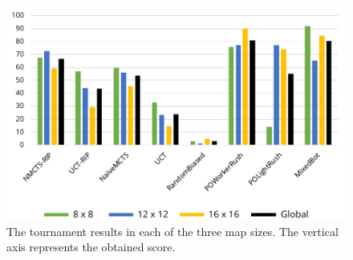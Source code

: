 \documentclass[conference]{IEEEtran}
\begin{document}
\begin{figure}[!t]
\begin{center}
	\includegraphics[width=1\columnwidth]{figs/TR.pdf}
	\caption{The tournament results in each of the three map sizes. The vertical axis represents the obtained score.}
	\label{TournamentResultsAllMaps}
\end{center}
\end{figure}
\end{document}
